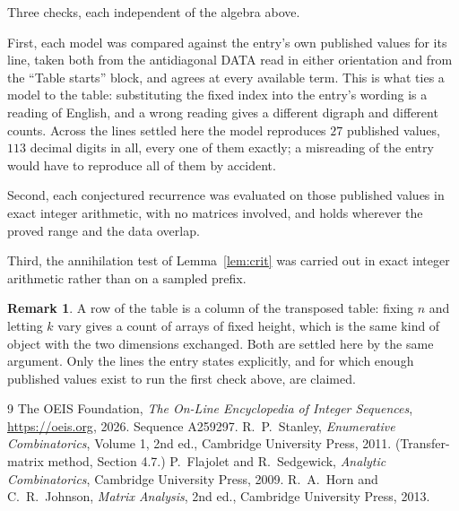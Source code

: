 \documentclass[11pt,a4paper]{article}
\theoremstyle{plain}
\theoremstyle{definition}
\newtheorem{remark}[theorem]{Remark}
\begin{document}
Three checks, each independent of the algebra above.

First, each model was compared against the entry's own published values for its line, taken
both from the antidiagonal DATA read in either orientation and from the ``Table starts''
block, and agrees at every available term. This is what ties a model to the table:
substituting the fixed index into the entry's wording is a reading of English, and a wrong
reading gives a different digraph and different counts. Across the lines settled here the
model reproduces $27$ published values, $113$ decimal digits in all, every one of
them exactly; a misreading of the entry would have to reproduce all of them by accident.

Second, each conjectured recurrence was evaluated on those published values in exact
integer arithmetic, with no matrices involved, and holds wherever the proved range and the
data overlap.

Third, the annihilation test of Lemma~\ref{lem:crit} was carried out in exact integer
arithmetic rather than on a sampled prefix.

\begin{remark}
A row of the table is a column of the transposed table: fixing $n$ and letting $k$ vary gives a
count of arrays of fixed height, which is the same kind of object with the two dimensions
exchanged. Both are settled here by the same argument. Only the lines the entry states
explicitly, and for which enough published values exist to run the first check above, are
claimed.
\end{remark}

\begin{thebibliography}{9}
 The OEIS Foundation, \emph{The On-Line Encyclopedia of Integer
Sequences}, \url{https://oeis.org}, 2026. Sequence A259297.
 R.~P.~Stanley, \emph{Enumerative Combinatorics}, Volume 1, 2nd ed.,
Cambridge University Press, 2011. (Transfer-matrix method, Section 4.7.)
 P.~Flajolet and R.~Sedgewick, \emph{Analytic Combinatorics}, Cambridge
University Press, 2009.
 R.~A.~Horn and C.~R.~Johnson, \emph{Matrix Analysis}, 2nd ed., Cambridge
University Press, 2013.
\end{thebibliography}
\end{document}
